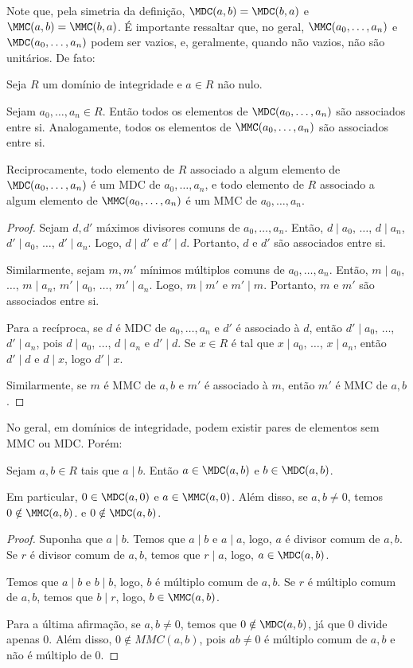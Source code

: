 Note que, pela simetria da definição, $\MDC(a, b)=\MDC(b, a)$ e $\MMC(a, b)=\MMC(b, a)$.
É importante ressaltar que, no geral, $\MMC(a_0, \dots, a_n)$ e $\MDC(a_0, \dots, a_n)$ podem ser vazios, e, geralmente, quando não vazios, não são unitários.
De fato:
\begin{lemma}
    Seja $R$ um domínio de integridade e $a \in R$ não nulo.

    Sejam $a_0, \dots, a_n \in R$.
    Então todos os elementos de $\MDC(a_0, \dots, a_n)$ são associados entre si.
    Analogamente, todos os elementos de $\MMC(a_0, \dots, a_n)$ são associados entre si.

    Reciprocamente, todo elemento de $R$ associado a algum elemento de $\MDC(a_0, \dots, a_n)$ é um MDC de $a_0, \dots, a_n$, e todo elemento de $R$ associado a algum elemento de $\MMC(a_0, \dots, a_n)$ é um MMC de $a_0, \dots, a_n$.
\end{lemma}
\begin{proof}
Sejam $d, d'$ máximos divisores comuns de $a_0, \dots, a_n$.
Então, $d\mid a_0$, $\dots$, $d\mid a_n$, $d'\mid a_0$, $\dots$, $d'\mid a_n$.
Logo, $d\mid d'$ e $d'\mid d$.
Portanto, $d$ e $d'$ são associados entre si.

Similarmente, sejam $m, m'$ mínimos múltiplos comuns de $a_0, \dots, a_n$.
Então, $m\mid a_0$, $\dots$, $m\mid a_n$, $m'\mid a_0$, $\dots$, $m'\mid a_n$.
Logo, $m\mid m'$ e $m'\mid m$.
Portanto, $m$ e $m'$ são associados entre si.

Para a recíproca, se $d$ é MDC de $a_0, \dots, a_n$ e $d'$ é associado à $d$, então $d'\mid a_0$, $\dots$, $d'\mid a_n$, pois $d\mid a_0$, $\dots$, $d\mid a_n$ e $d'\mid d$.
Se $x\in R$ é tal que $x\mid a_0$, $\dots$, $x\mid a_n$, então $d'\mid d$ e $d\mid x$, logo $d'\mid x$.

Similarmente, se $m$ é MMC de $a, b$ e $m'$ é associado à $m$, então $m'$ é MMC de $a, b$.
\end{proof}
No geral, em domínios de integridade, podem existir pares de elementos sem MMC ou MDC.
Porém:

\begin{lemma}
Sejam $a, b \in R$ tais que $a\mid b$.
Então $a \in \MDC(a, b)$ e $b \in \MDC(a, b)$.

Em particular, $0 \in \MDC(a, 0)$ e $a \in \MMC(a, 0)$.
Além disso, se $a, b \neq 0$, temos $0 \notin \MMC(a, b)$. e $0 \notin \MDC(a, b)$.
\end{lemma}

\begin{proof}
    Suponha que $a\mid b$.
    Temos que $a\mid b$ e $a\mid a$, logo, $a$ é divisor comum de $a, b$.
    Se $r$ é divisor comum de $a, b$, temos que $r\mid a$, logo, $a \in \MDC(a, b)$.

    Temos que $a\mid b$ e $b\mid b$, logo, $b$ é múltiplo comum de $a, b$.
    Se $r$ é múltiplo comum de $a, b$, temos que $b\mid r$, logo, $b \in \MMC(a, b)$.

    Para a última afirmação, se $a, b \neq 0$, temos que $0 \notin \MDC(a, b)$, já que $0$ divide apenas $0$.
    Além disso, $0 \notin MMC(a, b)$, pois $ab\neq 0$ é múltiplo comum de $a, b$ e não é múltiplo de $0$.
\end{proof}


